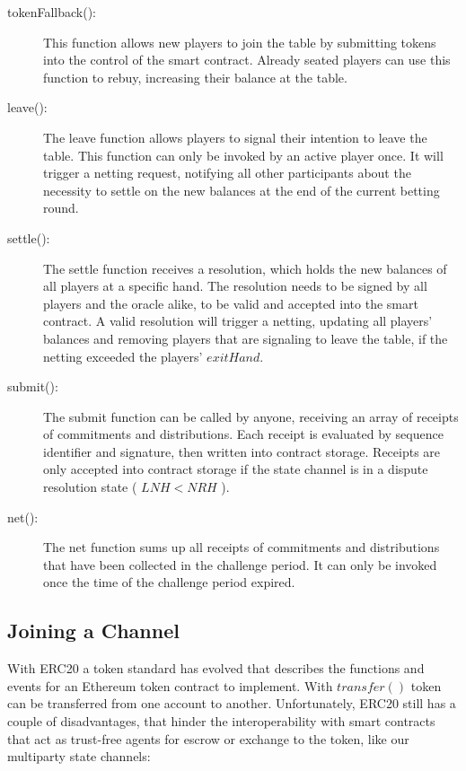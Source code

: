 \begin{description}
\item[tokenFallback():] This function allows new players to join the table by submitting tokens into the control of the smart contract. Already seated players can use this function to rebuy, increasing their balance at the table. 
\item[leave():] The leave function allows players to signal their intention to leave the table. This function can only be invoked by an active player once. It will trigger a netting request, notifying all other participants about the necessity to settle on the new balances at the end of the current betting round.
\item[settle():] The settle function receives a resolution, which holds the new balances of all players at a specific hand. The resolution needs to be signed by all players and the oracle alike, to be valid and accepted into the smart contract. A valid resolution will trigger a netting, updating all players' balances and removing players that are signaling to leave the table, if the netting exceeded the players' \(exitHand\).
\item[submit():] The submit function can be called by anyone, receiving an array of receipts of commitments and distributions. Each receipt is evaluated by sequence identifier and signature, then written into contract storage. Receipts are only accepted into contract storage if the state channel is in a dispute resolution state ( \(LNH < NRH\) ).
\item[net():] The net function sums up all receipts of commitments and distributions that have been collected in the challenge period. It can only be invoked once the time of the challenge period expired.
\end{description}



\subsection{Joining a Channel}

With ERC20 a token standard has evolved that describes the functions and events for an Ethereum token contract  to implement. With \(transfer()\) token can be transferred from one account to another. Unfortunately, ERC20 still has a couple of disadvantages, that hinder the interoperability with smart contracts that act as trust-free agents for escrow or exchange to the token, like our multiparty state channels:


